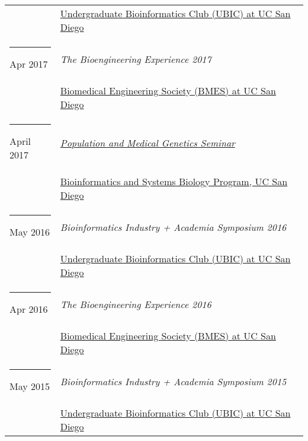 \documentclass[margin,line]{res}
\begin{document}
\begin{resume}
\begin{longtable}{@{}p{0.7in}p{4in}}
\hspace*{-4mm} & \hspace{4mm} \href{http://ubicucsd.github.io/}{Undergraduate Bioinformatics Club (UBIC) at UC San Diego}\\
\hspace*{-4mm} \rule{-1mm}{5mm} Apr 2017 & \textit{The Bioengineering Experience 2017}\\*
\hspace*{-4mm} & \hspace{4mm} \href{http://bmes.ucsd.edu/}{Biomedical Engineering Society (BMES) at UC San Diego}\\
\hspace*{-4mm} \rule{-1mm}{5mm} April 2017 & \href{https://gymreklab.github.io/teaching/medpopgen_seminar.html}{\textit{Population and Medical Genetics Seminar}}\\*
\hspace*{-4mm} & \hspace{4mm} \href{http://ubicucsd.github.io/}{Bioinformatics and Systems Biology Program, UC San Diego}\\
\hspace*{-4mm} \rule{-1mm}{5mm} May 2016 & \textit{Bioinformatics Industry + Academia Symposium 2016}\\*
\hspace*{-4mm} & \hspace{4mm} \href{http://ubicucsd.github.io/}{Undergraduate Bioinformatics Club (UBIC) at UC San Diego}\\
\hspace*{-4mm} \rule{-1mm}{5mm} Apr 2016 & \textit{The Bioengineering Experience 2016}\\*
\hspace*{-4mm} & \hspace{4mm} \href{http://bmes.ucsd.edu/}{Biomedical Engineering Society (BMES) at UC San Diego}\\
\hspace*{-4mm} \rule{-1mm}{5mm} May 2015 & \textit{Bioinformatics Industry + Academia Symposium 2015}\\*
\hspace*{-4mm} & \hspace{4mm} \href{http://ubicucsd.github.io/}{Undergraduate Bioinformatics Club (UBIC) at UC San Diego}\\
\end{longtable}


\end{resume}
\end{document}
